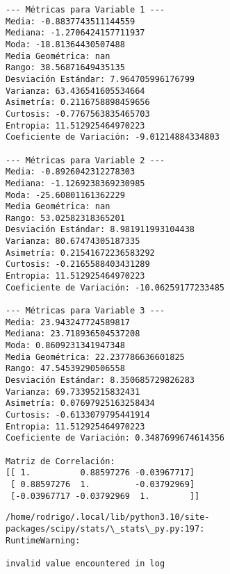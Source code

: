 \documentclass[11pt]{article}
\begin{document}
    \begin{Verbatim}[commandchars=\\\{\}]
--- Métricas para Variable 1 ---
Media: -0.8837743511144559
Mediana: -1.2706424157711937
Moda: -18.81364430507488
Media Geométrica: nan
Rango: 38.56871649435135
Desviación Estándar: 7.964705996176799
Varianza: 63.436541605534664
Asimetría: 0.2116758898459656
Curtosis: -0.7767563835465703
Entropia: 11.512925464970223
Coeficiente de Variación: -9.01214884334803

--- Métricas para Variable 2 ---
Media: -0.8926042312278303
Mediana: -1.1269238369230985
Moda: -25.60801161362229
Media Geométrica: nan
Rango: 53.02582318365201
Desviación Estándar: 8.981911993104438
Varianza: 80.67474305187335
Asimetría: 0.21541672236583292
Curtosis: -0.2165588403431289
Entropia: 11.512925464970223
Coeficiente de Variación: -10.06259177233485

--- Métricas para Variable 3 ---
Media: 23.943247724589817
Mediana: 23.718936504537208
Moda: 0.8609231341947348
Media Geométrica: 22.237786636601825
Rango: 47.54539290506558
Desviación Estándar: 8.350685729826283
Varianza: 69.73395215832431
Asimetría: 0.07697925163258434
Curtosis: -0.6133079795441914
Entropia: 11.512925464970223
Coeficiente de Variación: 0.3487699674614356

Matriz de Correlación:
[[ 1.          0.88597276 -0.03967717]
 [ 0.88597276  1.         -0.03792969]
 [-0.03967717 -0.03792969  1.        ]]
    \end{Verbatim}

    \begin{Verbatim}[commandchars=\\\{\}]
/home/rodrigo/.local/lib/python3.10/site-packages/scipy/stats/\_stats\_py.py:197:
RuntimeWarning:

invalid value encountered in log

    \end{Verbatim}

    \begin{center}
    \end{center}
    { \hspace*{\fill} \\}
    
    \begin{center}
    \end{center}
    { \hspace*{\fill} \\}
    
\end{document}
